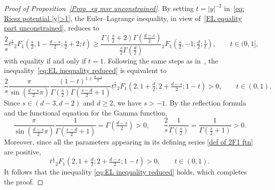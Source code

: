 \documentclass{amsart}
\theoremstyle{plain}
\theoremstyle{remark}
\numberwithin{equation}{section}
\begin{document}
\begin{proof}[Proof of Proposition~\ref{Prop_eq msr unconstrained}]
By setting $t=|y|^{-2}$ in~\eqref{eq: Riesz potential |y|>1},
the Euler--Lagrange inequality, in view of~\eqref{EL equality part unconstrained}, reduces to 
\begin{equation}
\label{eq:EL inequality reduced}
    \frac{2}{s}t^{ \frac{s}{2} } {}_2F_1(\tfrac{s}{2},1-\tfrac{d-s}{2} ;\tfrac{s}{2}+2;t) \ge \frac{\Gamma(\frac{s}{2}+2)\Gamma(\frac{d-s}{2})}{\frac{s}{2}\Gamma(\frac{d}{2})}
    {}_2F_1(\tfrac{s}{2}, -1; \tfrac{d}{2}; \tfrac{1}{t}), \qquad t \in (0, 1], 
\end{equation}
with equality if and only if $t=1$. Following the same steps as in~\cite[Lemma~3.5]{BFMS26}, the inequality~\eqref{eq:EL inequality reduced} is equivalent to 
\begin{equation}
    \frac{2}{s} \frac{\pi}{\sin(\tfrac{d-s}{2}\pi)}\frac{(1-t)^{1+\frac{d-s}{2}}}{\Gamma(\frac{s}{2})\Gamma(\tfrac{s-d}{2}+1)}
    t^{\frac{s}{2}}{}_2F_1(2, 1+\tfrac{d}{2}; 2+\tfrac{d-s}{2}; 1-t) >0,\qquad t\in (0,1).
\end{equation}
Since $s\in(d-3,d-2)$ and $d\ge2$, we have $s>-1$. By the reflection formula and the functional equation for the Gamma function, 
\begin{equation}
    \frac{\pi}{\sin(\frac{d-s}{2}\pi)}\frac{1}{\Gamma(\tfrac{s-d}{2}+1)}= \Gamma(\tfrac{d-s}{2}) >0, \qquad \frac{2}{s}\frac{1}{\Gamma(\frac{s}{2})}=\frac{1}{\Gamma(\tfrac{s}{2}+1)}>0.
\end{equation}
Moreover, since all the parameters  appearing in its defining series \eqref{def of 2F1 ftn} are positive,
\begin{equation}
    t^{\frac{s}{2}}{}_2F_1(2, 1+\tfrac{d}{2}; 2+\tfrac{d-s}{2}; 1-t) >0, \qquad t\in (0,1).
\end{equation}
It follows that the inequality \eqref{eq:EL inequality reduced} holds, which completes the proof. 
\end{proof}
 
\end{document}
